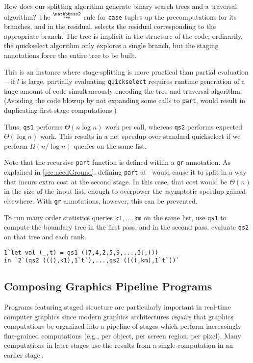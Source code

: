 How does our splitting algorithm generate binary search trees and a traversal
algorithm? The $\splittwosym$ rule for \texttt{case} tuples up the
precomputations for its branches, and in the residual, selects the residual
corresponding to the appropriate branch. The tree is implicit in the structure
of the code; ordinarily, the quickselect algorithm only explores a single
branch, but the staging annotations force the entire tree to be built.

This is an instance where stage-splitting is more practical than partial
evaluation---if $l$ is large, partially evaluating \texttt{quickselect} requires
runtime generation of a huge amount of code simultaneously encoding the tree and
traversal algorithm. (Avoiding the code blowup by not expanding some calls to
\texttt{part}, would result in duplicating first-stage computations.)

Thus, \texttt{qs1} performs $\Theta(n \log n)$ work per call, whereas
\texttt{qs2} performs expected $\Theta(\log n)$ work.  This results in a net
speedup over standard quickselect if we perform $\Omega(n / \log n)$ queries on
the same list. 

Note that the recursive \texttt{part} function is defined within a \texttt{gr}
annotation.  As explained in \ref{sec:needGround}, defining \texttt{part}
at \bbonem\ would cause it to split in a way that incurs extra cost at the second stage.
In this case, that cost would be $\Theta(n)$ in the size of the input list,
enough to overpower the asymptotic speedup gained elsewhere.
With \texttt{gr} annotations, however, this can be prevented.

To run many order statistics queries $\texttt{k1},\dots,\texttt{km}$ on the same
list, use \texttt{qs1} to compute the boundary tree in the first pass, and in
the second pass, evaluate \texttt{qs2} on that tree and each rank.
\begin{lstlisting}
1`let val (_,t) = qs1 ([7,4,2,5,9,...,3],())
in `2`(qs2 (((),k1),1`t`),...,qs2 (((),km),1`t`))`
\end{lstlisting}
%

\subsection{Composing Graphics Pipeline Programs}
\label{sec:graphics}

Programs featuring staged structure are particularly important in
real-time computer graphics since modern graphics architectures
\emph{require} that graphics computations be organized into a pipeline
of stages which perform increasingly fine-grained computations (e.g.,
per object, per screen region, per pixel). Many computations in later
stages use the results from a single computation in an earlier
stage\,\cite{OpenGL4Spec}.

